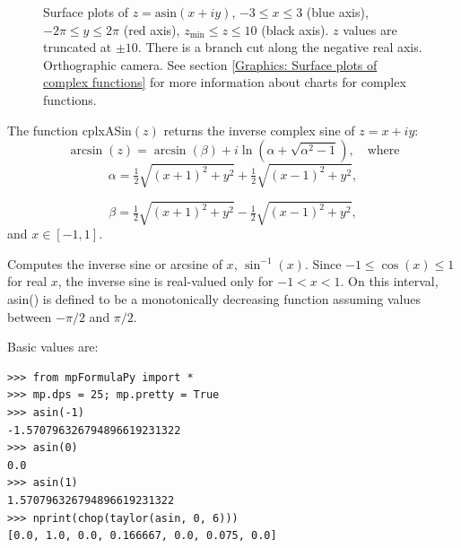 \begin{figure}[ht]%
	\centering
	\qquad
	\caption[Complex Arcsine]{Surface plots of $z = \text{asin}(x + iy)$, $-3 \leq x \leq 3$ (blue axis), $-2 \pi \leq y \leq 2\pi$ (red axis), $z_{\text{min}} \leq z \leq 10$ (black axis). $z$ values are truncated at $\pm 10$. There is a branch cut along the negative real axis. Orthographic camera. See section \ref{Graphics: Surface plots of complex functions} for more information about charts for complex functions.} 
	\label{fig:Complex Arcsine}%
\end{figure}


\vspace{0.3cm}
The function \textsf{cplxASin$(z)$} returns the inverse complex sine of $z=x+iy$: 
\begin{equation}
	\arcsin(z) = \arcsin(\beta) + i \ln \left(\alpha + \sqrt{\alpha^2 -1}\right), \quad \text{where}
\end{equation}
\begin{equation}
	\label{complexAlpha}
	\alpha = \tfrac{1}{2} \sqrt{(x+1)^2 + y^2} + \tfrac{1}{2} \sqrt{(x-1)^2 + y^2},
\end{equation}

\begin{equation}
	\label{complexBeta}
	\beta = \tfrac{1}{2} \sqrt{(x+1)^2 + y^2} - \tfrac{1}{2} \sqrt{(x-1)^2 + y^2},
\end{equation}
and $x \in [-1,1]$.


Computes the inverse sine or arcsine of $x$, $\sin^{-1}(x)$. Since $-1 \le \cos(x) \le 1$ for real $x$, the inverse sine is real-valued only for $-1 < x < 1$. On this interval, asin() is defined to be a monotonically decreasing function assuming values between $-\pi/2$ and $\pi/2$.

Basic values are:
\begin{lstlisting}
>>> from mpFormulaPy import *
>>> mp.dps = 25; mp.pretty = True
>>> asin(-1)
-1.570796326794896619231322
>>> asin(0)
0.0
>>> asin(1)
1.570796326794896619231322
>>> nprint(chop(taylor(asin, 0, 6)))
[0.0, 1.0, 0.0, 0.166667, 0.0, 0.075, 0.0]
\end{lstlisting}

